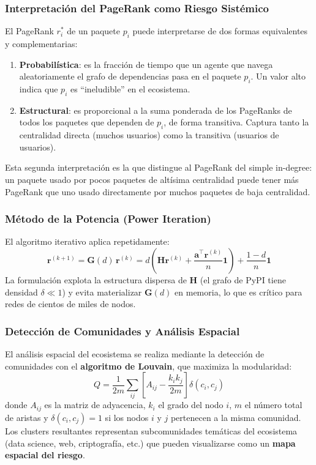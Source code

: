\subsubsection{Interpretación del PageRank como Riesgo Sistémico}
El PageRank $r_i^*$ de un paquete $p_i$ puede interpretarse de dos formas
equivalentes y complementarias:
\begin{enumerate}
    \item \textbf{Probabilística}: es la fracción de tiempo que un agente que
          navega aleatoriamente el grafo de dependencias pasa en el paquete $p_i$.
          Un valor alto indica que $p_i$ es ``ineludible'' en el ecosistema.
    \item \textbf{Estructural}: es proporcional a la suma ponderada de los
          PageRanks de todos los paquetes que dependen de $p_i$, de forma
          transitiva. Captura tanto la centralidad directa (muchos usuarios)
          como la transitiva (usuarios de usuarios).
\end{enumerate}
Esta segunda interpretación es la que distingue al PageRank del simple in-degree:
un paquete usado por pocos paquetes de altísima centralidad puede tener más
PageRank que uno usado directamente por muchos paquetes de baja centralidad.

\subsubsection{Método de la Potencia (Power Iteration)}
El algoritmo iterativo aplica repetidamente:
\[
    \mathbf{r}^{(k+1)} = \mathbf{G}(d)\,\mathbf{r}^{(k)}
    = d\!\left(\mathbf{H}\mathbf{r}^{(k)} +
      \frac{\mathbf{a}^\top\mathbf{r}^{(k)}}{n}\mathbf{1}\right)
      + \frac{1-d}{n}\mathbf{1}
\]
La formulación explota la estructura dispersa de $\mathbf{H}$ (el grafo de
PyPI tiene densidad $\delta \ll 1$) y evita materializar $\mathbf{G}(d)$
en memoria, lo que es crítico para redes de cientos de miles de nodos.

\subsubsection{Detección de Comunidades y Análisis Espacial}
El análisis espacial del ecosistema se realiza mediante la detección de
comunidades con el \textbf{algoritmo de Louvain}, que maximiza la modularidad:
\[
    Q = \frac{1}{2m} \sum_{ij} \left[ A_{ij} - \frac{k_i k_j}{2m} \right]
    \delta(c_i, c_j)
\]
donde $A_{ij}$ es la matriz de adyacencia, $k_i$ el grado del nodo $i$,
$m$ el número total de aristas y $\delta(c_i, c_j) = 1$ si los nodos $i$
y $j$ pertenecen a la misma comunidad. Los clusters resultantes representan
subcomunidades temáticas del ecosistema (data science, web, criptografía, etc.)
que pueden visualizarse como un \textbf{mapa espacial del riesgo}.

